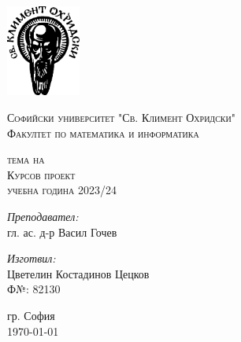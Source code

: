 \newcommand{\univname}{Софийски университет "Св. Климент Охридски"\\Факултет по математика и информатика}

\begin{titlepage}
    \begin{center}
    \vspace*{-2.3cm}
    \includegraphics[height=3cm]{resources/su_logo.png}
        
    \vspace*{.06\textheight}
    {\scshape\large \univname\par}\vspace{2.5cm}
    
    {\huge \bfseries{\thetitle}\par}\vspace{0.7cm}
    \textsc{\small тема на}\\[0.6cm]
    \textsc{\Large Курсов проект}\\[0.5cm]\vspace{0.5cm}
    \textsc{\normalsize учебна година 2023/24}\\[0.6cm]\vspace{2.2cm}
    
        
    \begin{minipage}[t]{0.4\textwidth}
        \begin{flushleft} \large
        \emph{Преподавател:}\\[0.7cm]
        гл. ас. д-р Васил Гочев\\[1.6cm]
        
        \end{flushleft}
    \end{minipage}
    \begin{minipage}[t]{0.4\textwidth}
        \begin{flushright} \large
        \emph{Изготвил:}\\[0.7cm]
        Цветелин Костадинов Цецков\\[0.5cm]
        Ф№: 82130\\[0.5cm]
        \end{flushright}
    \end{minipage}

    \vspace{1cm}
    {\large 
    гр. София\\[0.5cm]
    \today
    }
    
    \end{center}
\end{titlepage}
